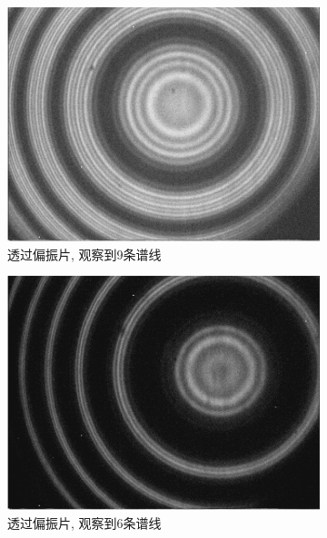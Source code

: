 \documentclass[12pt,a4paper]{article}
\begin{document}
\begin{figure}[H]
    \centering
    \begin{subfigure}[b]{0.3\textwidth}
      \centering
      \includegraphics[width=\textwidth]{2.74gp.jpg}
      \caption{透过偏振片, 观察到9条谱线}
    \end{subfigure}
    \hfill
    \begin{subfigure}[b]{0.3\textwidth}
      \centering
      \includegraphics[width=\textwidth]{2.74gp3.jpg}
      \caption{透过偏振片, 观察到6条谱线}
    \end{subfigure}
    \hfill
    \begin{subfigure}[b]{0.3\textwidth}
      \centering

\end{subfigure}
\end{figure}
\end{document}
